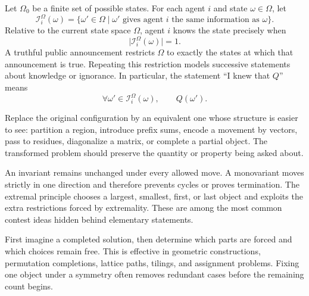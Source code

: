     \begin{strategy}
        Let $\Omega_0$ be a finite set of possible states. For each agent $i$ and
        state $\omega\in\Omega$, let
        \[
            \mathcal{I}_i^\Omega(\omega)
            =
            \{\omega'\in\Omega\mid
              \omega'\text{ gives agent }i\text{ the same information as }\omega\}.
        \]
        Relative to the current state space $\Omega$, agent $i$ knows the state
        precisely when
        \[
            \bigl|\mathcal{I}_i^\Omega(\omega)\bigr|=1.
        \]
        A truthful public announcement restricts $\Omega$ to exactly the states
        at which that announcement is true. Repeating this restriction models
        successive statements about knowledge or ignorance. In particular, the
        statement ``I knew that $Q$'' means
        \[
            \forall\omega'\in\mathcal{I}_i^\Omega(\omega),
            \qquad
            Q(\omega').
        \]
    \end{strategy}

    \begin{strategy}
        Replace the original configuration by an equivalent one whose structure
        is easier to see: partition a region, introduce prefix sums, encode a
        movement by vectors, pass to residues, diagonalize a matrix, or complete
        a partial object. The transformed problem should preserve the quantity or
        property being asked about.
    \end{strategy}

    \begin{strategy}
        An invariant remains unchanged under every allowed move. A monovariant
        moves strictly in one direction and therefore prevents cycles or proves
        termination. The extremal principle chooses a largest, smallest, first,
        or last object and exploits the extra restrictions forced by extremality.
        These are among the most common contest ideas hidden behind elementary
        statements.
    \end{strategy}

    \begin{strategy}
        First imagine a completed solution, then determine which parts are forced
        and which choices remain free. This is effective in geometric
        constructions, permutation completions, lattice paths, tilings, and
        assignment problems. Fixing one object under a symmetry often removes
        redundant cases before the remaining count begins.
    \end{strategy}


